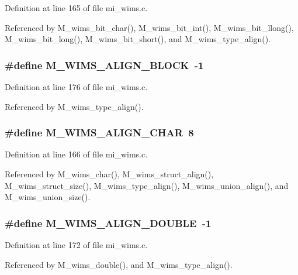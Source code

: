 Definition at line 165 of file mi\_\-wims.c.

Referenced by M\_\-wims\_\-bit\_\-char(), M\_\-wims\_\-bit\_\-int(), M\_\-wims\_\-bit\_\-llong(), M\_\-wims\_\-bit\_\-long(), M\_\-wims\_\-bit\_\-short(), and M\_\-wims\_\-type\_\-align().
\subsubsection{\setlength{\rightskip}{0pt plus 5cm}\#define M\_\-WIMS\_\-ALIGN\_\-BLOCK~-1}\label{mi__wims_8c_cf1bf4e9153a5c4825f0b99c40c794b8}




Definition at line 176 of file mi\_\-wims.c.

Referenced by M\_\-wims\_\-type\_\-align().
\subsubsection{\setlength{\rightskip}{0pt plus 5cm}\#define M\_\-WIMS\_\-ALIGN\_\-CHAR~8}\label{mi__wims_8c_71064fb4a6c00c1271a2b2af68715c58}




Definition at line 166 of file mi\_\-wims.c.

Referenced by M\_\-wims\_\-char(), M\_\-wims\_\-struct\_\-align(), M\_\-wims\_\-struct\_\-size(), M\_\-wims\_\-type\_\-align(), M\_\-wims\_\-union\_\-align(), and M\_\-wims\_\-union\_\-size().
\subsubsection{\setlength{\rightskip}{0pt plus 5cm}\#define M\_\-WIMS\_\-ALIGN\_\-DOUBLE~-1}\label{mi__wims_8c_9cde6159cf5fe2a2b47eb89cf9739a0a}




Definition at line 172 of file mi\_\-wims.c.

Referenced by M\_\-wims\_\-double(), and M\_\-wims\_\-type\_\-align().
